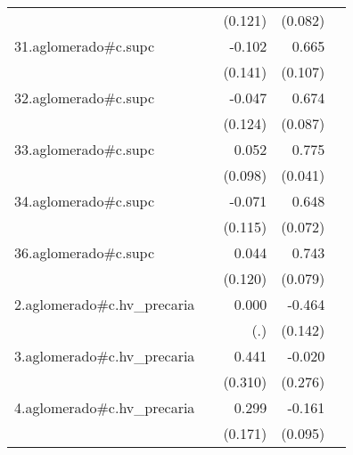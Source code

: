 {\begin{longtable}{l*{4}{D{.}{.}{-1}}}
            &                     &     (0.121)         &     (0.082)         &                     \\
\addlinespace
31.aglomerado#c.supc&                     &      -0.102         &       0.665\sym{***}&                     \\
            &                     &     (0.141)         &     (0.107)         &                     \\
\addlinespace
32.aglomerado#c.supc&                     &      -0.047         &       0.674\sym{***}&                     \\
            &                     &     (0.124)         &     (0.087)         &                     \\
\addlinespace
33.aglomerado#c.supc&                     &       0.052         &       0.775\sym{***}&                     \\
            &                     &     (0.098)         &     (0.041)         &                     \\
\addlinespace
34.aglomerado#c.supc&                     &      -0.071         &       0.648\sym{***}&                     \\
            &                     &     (0.115)         &     (0.072)         &                     \\
\addlinespace
36.aglomerado#c.supc&                     &       0.044         &       0.743\sym{***}&                     \\
            &                     &     (0.120)         &     (0.079)         &                     \\
\addlinespace
2.aglomerado#c.hv\_precaria&                     &       0.000         &      -0.464\sym{**} &                     \\
            &                     &         (.)         &     (0.142)         &                     \\
\addlinespace
3.aglomerado#c.hv\_precaria&                     &       0.441         &      -0.020         &                     \\
            &                     &     (0.310)         &     (0.276)         &                     \\
\addlinespace
4.aglomerado#c.hv\_precaria&                     &       0.299         &      -0.161         &                     \\
            &                     &     (0.171)         &     (0.095)         &                     \\

\end{longtable}}
